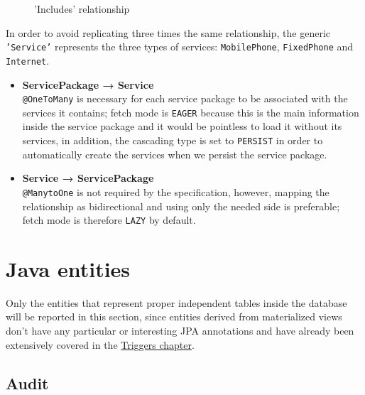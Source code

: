\begin{minipage}[h]{0.5\textwidth}
    \begin{figure}[H]
        
        \caption{'Includes' relationship}
        \label{fig:orm_sp_s}
    \end{figure}
\end{minipage}
\hfill
\begin{minipage}[h]{0.48\textwidth}
    In order to avoid replicating three times the same relationship, the generic \texttt{'Service'} represents the three types of services: \texttt{MobilePhone}, \texttt{FixedPhone} and \texttt{Internet}.
    \begin{itemize}
        \item \textbf{ServicePackage → Service} \\ \texttt{@OneToMany} is necessary for each service package to be associated with the services it contains; fetch mode is \texttt{EAGER} because this is the main information inside the service package and it would be pointless to load it without its services, in addition, the cascading type is set to \texttt{PERSIST} in order to automatically create the services when we persist the service package. 
        \item \textbf{Service → ServicePackage} \\ \texttt{@ManytoOne} is not required by the specification, however, mapping the relationship as bidirectional and using only the needed side is preferable; fetch mode is therefore \texttt{LAZY} by default.
    \end{itemize}
\end{minipage}


\section{Java entities}
\label{sec:java_ent}

Only the entities that represent proper independent tables inside the database will be reported in this section, since entities derived from materialized views don't have any particular or interesting JPA annotations and have already been extensively covered in the \hyperref[chap:views_triggers]{Triggers chapter}.

\subsection*{Audit}

